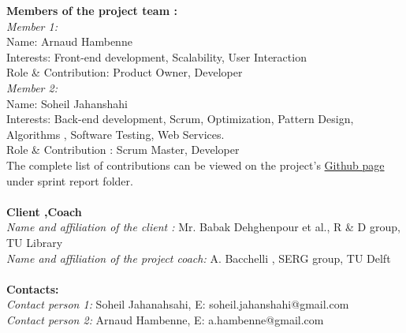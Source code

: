  \bigskip
 \textbf{Members of the project team :\\}
  \textit{Member 1: \\}
	Name: Arnaud Hambenne\\
	Interests: Front-end development, Scalability, User Interaction\\ 
	Role \& Contribution: Product Owner, Developer\\
   \textit{Member 2: \\}
   Name: Soheil Jahanshahi\\
   Interests: Back-end development, Scrum, Optimization, Pattern Design, Algorithms , Software Testing, Web Services.\\ 
   Role \& Contribution : Scrum Master, Developer\\
 The complete list of contributions can be viewed on the project's \href{https://github.com/solix/Virtual.Assistant.TU.Library/tree/master/Documentation/Sprint%20Reports}{Github page} under sprint report folder.\\\\
\textbf{Client ,Coach \\}
\textit{Name and affiliation of the client : } Mr. Babak Dehghenpour et al., R \& D group, TU Library\\
\textit{Name and affiliation of the project coach:} A. Bacchelli , SERG group, TU Delft \\\\
\textbf{Contacts: \\}
\textit{Contact person 1: } Soheil Jahanahsahi, E: soheil.jahanshahi@gmail.com \\
\textit{Contact person 2: } Arnaud Hambenne, E: a.hambenne@gmail.com 


